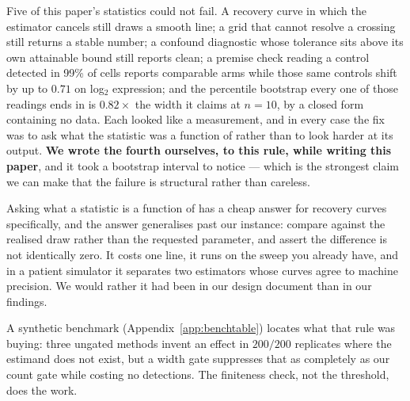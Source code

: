 \iffull
Five of this paper's statistics could not fail. A recovery curve in which the
estimator cancels still draws a smooth line; a grid that cannot resolve a
crossing still returns a stable number; a confound diagnostic whose tolerance
sits above its own attainable bound still reports clean; a premise check
reading a control detected in 99\% of cells reports comparable arms while those
same controls shift by up to $0.71$ on log$_2$ expression; and the percentile
bootstrap every one of those readings ends in is $0.82\times$ the width it claims
at $n = 10$, by a closed form containing no data. Each looked like a
measurement, and in every case the fix was to ask what the statistic was a
function of rather than to look harder at its output. \textbf{We wrote the
fourth ourselves, to this rule, while writing this paper}, and it took a
bootstrap interval to notice --- which is the strongest claim we can make that
the failure is structural rather than careless.
\fi

Asking what a statistic is a function of has a cheap answer for recovery curves
specifically, and the answer generalises past our instance: compare against the
realised draw rather than the requested parameter, and assert the difference is
not identically zero.
It costs one line, it runs on the sweep you already have, and in a patient
simulator it separates two estimators whose curves agree to machine precision.
We would rather it had been in our design document than in our findings.

A synthetic benchmark (Appendix~\ref{app:benchtable}) locates what that rule was
buying: three ungated methods invent an effect in $200/200$ replicates where the
estimand does not exist, but a width gate suppresses that as completely as our
count gate while costing no detections. The finiteness check, not the threshold,
does the work.
